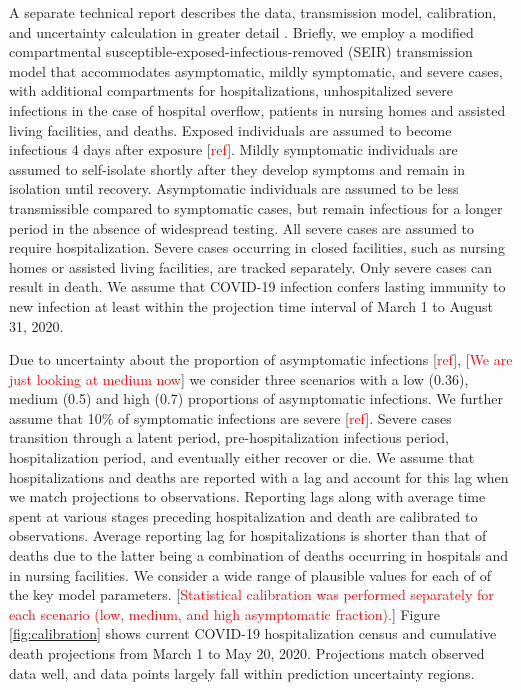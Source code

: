 \documentclass[11pt]{article}
\newcommand{\comment}[1]{[\textcolor{red}{#1}]}
\begin{document}
A separate technical report describes the data, transmission model, calibration, and uncertainty calculation in greater detail \citep{morozova2020tech}.  Briefly, we employ a modified compartmental susceptible-exposed-infectious-removed (SEIR) transmission model that accommodates asymptomatic, mildly symptomatic, and severe cases, with additional compartments for hospitalizations, unhospitalized severe infections in the case of hospital overflow, patients in nursing homes and assisted living facilities, and deaths. 
Exposed individuals are assumed to become infectious 4 days after exposure \comment{ref}.  Mildly symptomatic individuals are assumed to self-isolate shortly after they develop symptoms and remain in isolation until recovery. Asymptomatic individuals are assumed to be less transmissible compared to symptomatic cases, but remain infectious for a longer period in the absence of widespread testing. All severe cases are assumed to require hospitalization. Severe cases occurring in closed facilities, such as nursing homes or assisted living facilities, are tracked separately. Only severe cases can result in death. We assume that COVID-19 infection confers lasting immunity to new infection at least within the projection time interval of March 1 to August 31, 2020.  

Due to uncertainty about the proportion of asymptomatic infections \comment{ref}, \comment{We are just looking at medium now} we consider three scenarios with a low (0.36), medium (0.5) and high (0.7) proportions of asymptomatic infections. We further assume that 10\% of symptomatic infections are severe \comment{ref}. Severe cases transition through a latent period, pre-hospitalization infectious period, hospitalization period, and eventually either recover or die. We assume that hospitalizations and deaths are reported with a lag and account for this lag when we match projections to observations. Reporting lags along with average time spent at various stages preceding hospitalization and death are calibrated to observations. Average reporting lag for hospitalizations is shorter than that of deaths due to the latter being a combination of deaths occurring in hospitals and in nursing facilities.  We consider a wide range of plausible values for each of of the key model parameters.  \comment{Statistical calibration was performed separately for each scenario (low, medium, and high asymptomatic fraction).}
Figure \ref{fig:calibration} shows current COVID-19 hospitalization census and cumulative death projections from March 1 to May 20, 2020.  Projections match observed data well, and data points largely fall within prediction uncertainty regions. 
\end{document}
